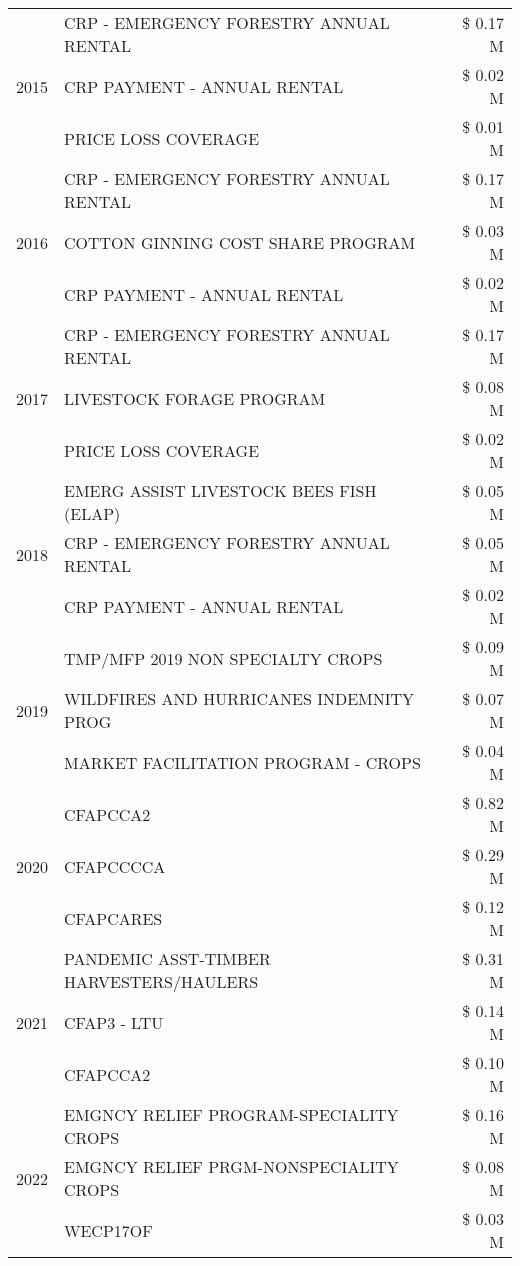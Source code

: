 \begin{tabular}{llr}
\cline{1-3}
\multirow[t]{3}{*}{2015} & CRP - EMERGENCY FORESTRY ANNUAL RENTAL & \$ 0.17 M \\
 & CRP PAYMENT - ANNUAL RENTAL & \$ 0.02 M \\
 & PRICE LOSS COVERAGE & \$ 0.01 M \\
\cline{1-3}
\multirow[t]{3}{*}{2016} & CRP - EMERGENCY FORESTRY ANNUAL RENTAL & \$ 0.17 M \\
 & COTTON GINNING COST SHARE PROGRAM & \$ 0.03 M \\
 & CRP PAYMENT - ANNUAL RENTAL & \$ 0.02 M \\
\cline{1-3}
\multirow[t]{3}{*}{2017} & CRP - EMERGENCY FORESTRY ANNUAL RENTAL & \$ 0.17 M \\
 & LIVESTOCK FORAGE PROGRAM & \$ 0.08 M \\
 & PRICE LOSS COVERAGE & \$ 0.02 M \\
\cline{1-3}
\multirow[t]{3}{*}{2018} & EMERG ASSIST LIVESTOCK BEES FISH (ELAP) & \$ 0.05 M \\
 & CRP - EMERGENCY FORESTRY ANNUAL RENTAL & \$ 0.05 M \\
 & CRP PAYMENT - ANNUAL RENTAL & \$ 0.02 M \\
\cline{1-3}
\multirow[t]{3}{*}{2019} & TMP/MFP 2019 NON SPECIALTY CROPS & \$ 0.09 M \\
 & WILDFIRES AND HURRICANES INDEMNITY PROG & \$ 0.07 M \\
 & MARKET FACILITATION PROGRAM - CROPS & \$ 0.04 M \\
\cline{1-3}
\multirow[t]{3}{*}{2020} & CFAPCCA2 & \$ 0.82 M \\
 & CFAPCCCCA & \$ 0.29 M \\
 & CFAPCARES & \$ 0.12 M \\
\cline{1-3}
\multirow[t]{3}{*}{2021} & PANDEMIC ASST-TIMBER HARVESTERS/HAULERS & \$ 0.31 M \\
 & CFAP3 - LTU & \$ 0.14 M \\
 & CFAPCCA2 & \$ 0.10 M \\
\cline{1-3}
\multirow[t]{3}{*}{2022} & EMGNCY RELIEF PROGRAM-SPECIALITY CROPS & \$ 0.16 M \\
 & EMGNCY RELIEF PRGM-NONSPECIALITY CROPS & \$ 0.08 M \\
 & WECP17OF & \$ 0.03 M \\
\cline{1-3}
\bottomrule
\end{tabular}
